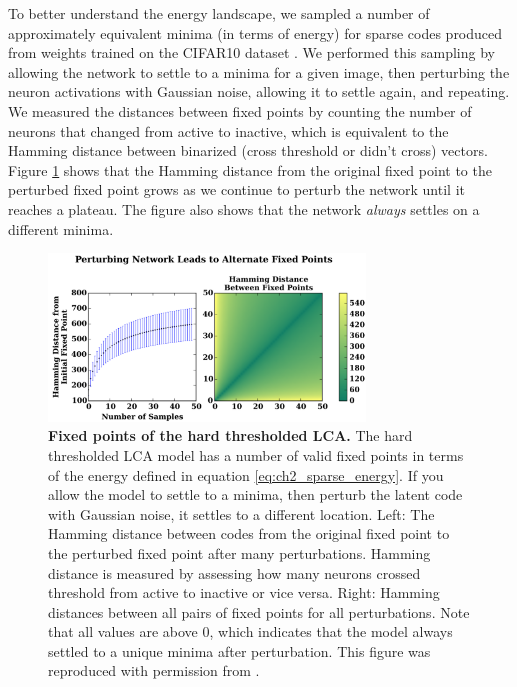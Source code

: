 To better understand the energy landscape, we sampled a number of approximately equivalent minima (in terms of energy) for sparse codes produced from weights trained on the CIFAR10 dataset \parencite{krizhevsky2009learning}. We performed this sampling by allowing the network to settle to a minima for a given image, then perturbing the neuron activations with Gaussian noise, allowing it to settle again, and repeating. We measured the distances between fixed points by counting the number of neurons that changed from active to inactive, which is equivalent to the Hamming distance between binarized (cross threshold or didn't cross) vectors. Figure \ref{fig:ch2_lca_fixed_point_distances} shows that the Hamming distance from the original fixed point to the perturbed fixed point grows as we continue to perturb the network until it reaches a plateau. The figure also shows that the network \textit{always} settles on a different minima.

\begin{figure}[h]
    \centering
    \includegraphics[width=0.75\textwidth]{figures/lca_fixed_point_distances.png}
    \caption{\textbf{Fixed points of the hard thresholded LCA.} The hard thresholded LCA model has a number of valid fixed points in terms of the energy defined in equation \eqref{eq:ch2_sparse_energy}. If you allow the model to settle to a minima, then perturb the latent code with Gaussian noise, it settles to a different location. Left: The Hamming distance between codes from the original fixed point to the perturbed fixed point after many perturbations. Hamming distance is measured by assessing how many neurons crossed threshold from active to inactive or vice  versa. Right: Hamming distances between all pairs of fixed points for all perturbations. Note that all values are above 0, which indicates that the model always settled to a unique minima after perturbation. This figure was reproduced with permission from \parencite{shainin2016sampling}.}
    \label{fig:ch2_lca_fixed_point_distances}
\end{figure}


